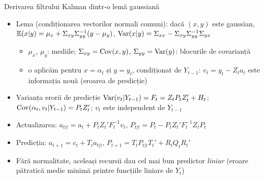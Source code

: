 \begin{frame}{Derivarea filtrului Kalman dintr-o lemă gaussiană}
\itemsize{\small}
\begin{itemize}
    \item \hypertarget{kflemma}{}Lema (condiționarea vectorilor normali comuni): dacă $(x, y)$ este gaussian, $\mathbb{E}(x | y) = \mu_x + \Sigma_{xy}\Sigma_{yy}^{-1}(y - \mu_y)$, $\text{Var}(x | y) = \Sigma_{xx} - \Sigma_{xy}\Sigma_{yy}^{-1}\Sigma_{yx}$
    \begin{itemize}
        \item $\mu_x$, $\mu_y$: mediile; $\Sigma_{xy} = \text{Cov}(x, y)$, $\Sigma_{yy} = \text{Var}(y)$: blocurile de covarianță
        \item o aplicăm pentru $x = \alpha_t$ și $y = y_t$, condiționat de $Y_{t-1}$: $v_t = y_t - Z_ta_t$ este informația nouă (eroarea de predicție)
    \end{itemize}
    \item Varianța erorii de predicție $\text{Var}(v_t | Y_{t-1}) = F_t = Z_tP_tZ_t' + H_t$; $\text{Cov}(\alpha_t, v_t | Y_{t-1}) = P_tZ_t'$; $v_t$ este independent de $Y_{t-1}$
    \item Actualizarea: $a_{t|t} = a_t + P_tZ_t'F_t^{-1}v_t$, $P_{t|t} = P_t - P_tZ_t'F_t^{-1}Z_tP_t$
    \item Predicția: $a_{t+1} = c_t + T_ta_{t|t}$, $P_{t+1} = T_tP_{t|t}T_t' + R_tQ_tR_t'$
    \item Fără normalitate, aceleași recursii dau cel mai bun predictor \emph{liniar} (eroare pătratică medie minimă printre funcțiile liniare de $Y_t$)
\end{itemize}
\end{frame}


